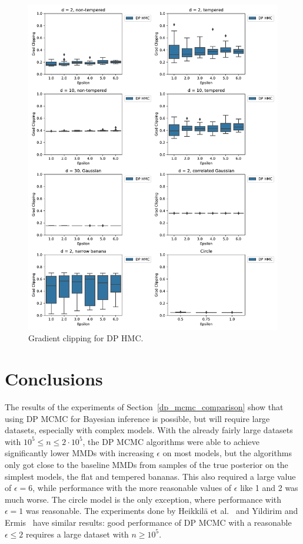 \documentclass[english,twoside,openright]{HYgraduMLDS}
\begin{document}
\begin{figure}
  \centering
  \includegraphics[width=\textwidth]{figures/grad_clipping}
  \caption{
    Gradient clipping for DP HMC.
  }
  \label{grad_clipping_fig}
\end{figure}

\chapter{Conclusions}\label{conclusion_chapter}

The results of the experiments of Section~\ref{dp_mcmc_comparison} show that
using DP MCMC for Bayesian inference is possible, but will require large
datasets, especially with complex models. With the already fairly large datasets
with \(10^{5} \leq n \leq 2\cdot 10^{5}\), the DP MCMC algorithms were able to
achieve significantly lower MMDs with increasing \(\epsilon\) on most models,
but the algorithms only got close to the baseline MMDs from samples of the
true posterior on the simplest models, the flat and tempered bananas. This also
required a large value of \(\epsilon = 6\), while performance with the more
reasonable values of \(\epsilon\) like 1 and 2 was much worse. The circle model
is the only exception, where performance with \(\epsilon = 1\) was reasonable.
The experiments done by Heikkilä et al.~\cite{HeikkilaJDH19}
and Yildirim and Ermis~\cite{YildirimE19} have similar results: good performance
of DP MCMC with a reasonable \(\epsilon \leq 2\) requires a large dataset with
\(n \geq 10^{5}\).
\end{document}
